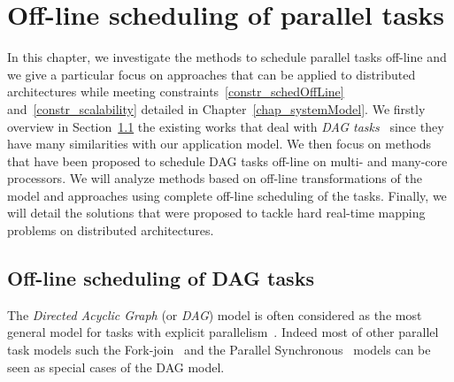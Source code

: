 \documentclass[main.tex]{subfiles}
\begin{document}
\chapter{Off-line scheduling of parallel tasks}
\thispagestyle{chapstyle}
\label{chap_schedParallelTasks}
\minitoc

In this chapter, we investigate the methods to schedule parallel tasks off-line and we give a particular focus on approaches that can be applied to distributed architectures while meeting constraints~\ref{constr_schedOffLine} and~\ref{constr_scalability} detailed in Chapter~\ref{chap_systemModel}. We firstly overview in Section~\ref{sec_stateOfTheArt_2_DAGsched} the existing works that deal with \emph{DAG tasks}~\cite{Baruah2012_RTSS} since they have many similarities with our application model. We then focus on methods that have been proposed to schedule DAG tasks off-line on multi- and many-core processors. We will analyze methods based on off-line transformations of the model and approaches using complete off-line scheduling of the tasks. Finally, we will detail the solutions that were proposed to tackle hard real-time mapping problems on distributed architectures. 

\section{Off-line scheduling of DAG tasks}
\label{sec_stateOfTheArt_2_DAGsched}

The \emph{Directed Acyclic Graph} (or \emph{DAG}) model is often considered as the most general model for tasks with explicit parallelism~\cite{Baruah2012_RTSS}. Indeed most of other parallel task models such the Fork-join~\cite{Lakshmanan2010} and the Parallel Synchronous~\cite{Saifullah2011} models can be seen as special cases of the DAG model.
\end{document}
